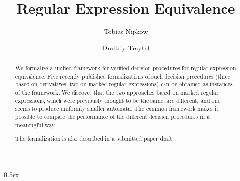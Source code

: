 \documentclass[11pt,a4paper]{article}
\begin{document}
\title{Regular Expression Equivalence}
\author{Tobias Nipkow \and Dmitriy Traytel}
\maketitle

\begin{abstract}
  We formalize a unified framework for verified decision procedures for regular
  expression equivalence. Five recently published formalizations of such
  decision procedures (three based on derivatives, two on marked regular
  expressions) can be obtained as instances of the framework. We discover that
  the two approaches based on marked regular expressions, which were previously
  thought to be the same, are different, and one seems to produce uniformly
  smaller automata.  The common framework makes it possible to compare the
  performance of the different decision procedures in a meaningful way.

  The formalization is also described in a submitted paper draft
  \cite{NipkowT-urexp}.
\end{abstract}

\tableofcontents

\parindent 0pt\parskip 0.5ex





\end{document}

